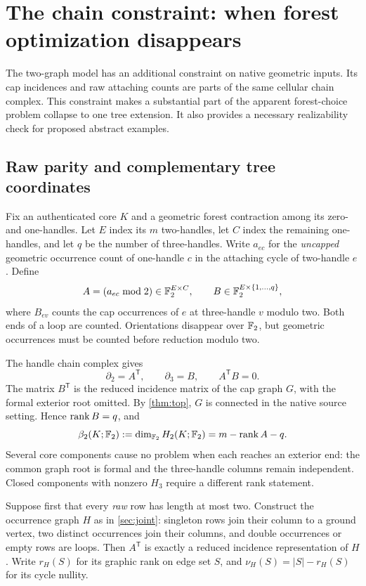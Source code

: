 \section{The chain constraint: when forest optimization disappears}
\label{sec:chain}

The two-graph model has an additional constraint on native geometric inputs.
Its cap incidences and raw attaching counts are parts of the same cellular
chain complex. This constraint makes a substantial part of the apparent
forest-choice problem collapse to one tree extension. It also provides a
necessary realizability check for proposed abstract examples.

\subsection{Raw parity and complementary tree coordinates}

Fix an authenticated core $K$ and a geometric forest contraction among its
zero- and one-handles. Let $E$ index its $m$ two-handles, let $C$ index the
remaining one-handles, and let $q$ be the number of three-handles. Write
$a_{ec}$ for the \emph{uncapped} geometric occurrence count of one-handle
$c$ in the attaching cycle of two-handle $e$. Define
\[
 A=(a_{ec}\bmod 2)\in\mathbb F_2^{E\times C},\qquad
 B\in\mathbb F_2^{E\times\{1,\ldots,q\}},
\]
where $B_{ev}$ counts the cap occurrences of $e$ at three-handle $v$ modulo
two. Both ends of a loop are counted. Orientations disappear over $\mathbb F_2$,
but geometric occurrences must be counted before reduction modulo two.

The handle chain complex gives
\begin{equation}
 \partial_2=A^{\mathsf T},\qquad
 \partial_3=B,\qquad A^{\mathsf T}B=0.
 \label{eq:boundary-boundary}
\end{equation}
The matrix $B^{\mathsf T}$ is the reduced incidence matrix of the cap graph
$G$, with the formal exterior root omitted. By \cref{thm:top}, $G$ is
connected in the native source setting. Hence $\operatorname{rank} B=q$, and
\begin{equation}
 \beta_2(K;\mathbb F_2):=\dim_{\mathbb F_2}H_2(K;\mathbb F_2)=m-\operatorname{rank} A-q.
 \label{eq:chain-beta}
\end{equation}
Several core components cause no problem when each reaches an exterior
end: the common graph root is formal and the three-handle columns remain
independent. Closed components with nonzero $H_3$ require a different rank
statement.

Suppose first that every \emph{raw} row has length at most two. Construct
the occurrence graph $H$ as in \cref{sec:joint}: singleton rows join their
column to a ground vertex, two distinct occurrences join their columns,
and double occurrences or empty rows are loops. Then $A^{\mathsf T}$ is
exactly a reduced incidence representation of $H$. Write $r_H(S)$ for its
graphic rank on edge set $S$, and $\nu_H(S)=|S|-r_H(S)$ for its cycle
nullity.

